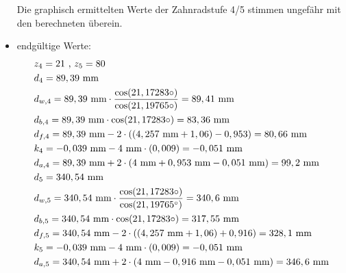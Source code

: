 \begin{itemize}
Die graphisch ermittelten Werte der Zahnradstufe 4/5 stimmen ungefähr mit den berechneten überein. \\
\item endgültige Werte:
\begin{align*}
	&z_4 = 21 \text{ , } z_5 = 80 \\
	&d_4 = 89,39 \text{ mm} \\
	&d_{w,4} = 89,39  \text{ mm}\cdot \frac{\cos(21,17283\circ)}{\cos(21,19765\circ)} = 89,41  \text{ mm}\\
	&d_{b,4} = 89,39  \text{ mm} \cdot \cos(21,17283\circ) = 83,36  \text{ mm}\\
	&d_{f,4} = 89,39  \text{ mm} -2 \cdot ((4,257 \text{ mm}+1,06)-0,953) = 80,66 \text{ mm}\\
	&k_4 = -0,039 \text{ mm} -4 \text{ mm} \cdot (0,009) =- 0,051 \text{ mm}\\
	&d_{a,4} = 89,39  \text{ mm} +2 \cdot (4\text{ mm}+0,953 \text{ mm} -0,051 \text{ mm}) = 99,2\text{ mm}\\
	&d_5 =340,54 \text{ mm} \\
	&d_{w,5} = 340,54  \text{ mm}\cdot \frac{\cos(21,17283\circ)}{\cos(21,19765^\circ)} = 340,6  \text{ mm}\\
	&d_{b,5} = 340,54  \text{ mm} \cdot \cos(21,17283\circ) = 317,55  \text{ mm}\\
	&d_{f,5} = 340,54  \text{ mm} -2 \cdot ((4,257 \text{ mm}+1,06)+0,916) = 328,1 \text{ mm}\\
	&k_5 = -0,039 \text{ mm} -4 \text{ mm} \cdot (0,009) =- 0,051 \text{ mm}\\
	&d_{a,5} = 340,54  \text{ mm} +2 \cdot (4\text{ mm}-0,916 \text{ mm} -0,051 \text{ mm}) = 346,6\text{ mm}
\end{align*}
\end{itemize}
